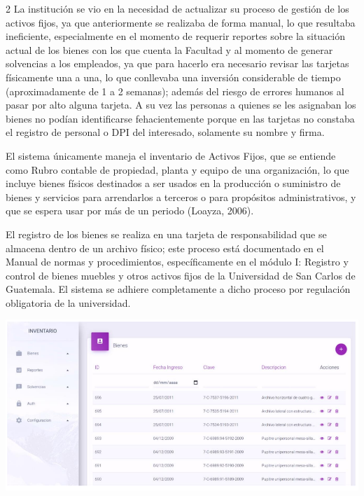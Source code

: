 \documentclass[12pt,spanish,Letterpaper,openany]{book}
\begin{document}
\begin {multicols}{2}
La institución se vio en la necesidad de actualizar su proceso de gestión de los activos fijos, ya que anteriormente se realizaba de forma manual, lo que resultaba ineficiente, especialmente en el momento de requerir reportes sobre la situación actual de los bienes con los que cuenta la Facultad y al momento de generar solvencias a los empleados, ya que para hacerlo era necesario revisar las tarjetas físicamente una a una, lo que conllevaba una inversión considerable de tiempo (aproximadamente de 1 a 2 semanas); además del riesgo de errores humanos al pasar por alto alguna tarjeta. A su vez las personas a quienes se les asignaban los bienes no podían identificarse fehacientemente porque en las tarjetas no constaba el registro de personal o DPI del interesado, solamente su nombre y firma.

El sistema únicamente maneja el inventario de Activos Fijos, que se entiende como Rubro contable de propiedad, planta y equipo de una organización, lo que incluye bienes físicos destinados a ser usados en la producción o suministro de bienes y servicios para arrendarlos a terceros o para propósitos administrativos, y que se espera usar por más de un periodo (Loayza, 2006).

El registro de los bienes se realiza en una tarjeta de responsabilidad que se almacena dentro de un archivo físico; este proceso está documentado en el Manual de normas y procedimientos, específicamente en el módulo I: Registro y control de bienes muebles y otros activos fijos de la Universidad de San Carlos de Guatemala. El sistema se adhiere completamente a dicho proceso por regulación obligatoria de la universidad.

\end {multicols}

\begin {flushleft}
\noindent\begin{minipage}[c]{\columnwidth}

\includegraphics[width=1\linewidth]{images/07_02}

\end{minipage}

\end {flushleft}
\end{document}
